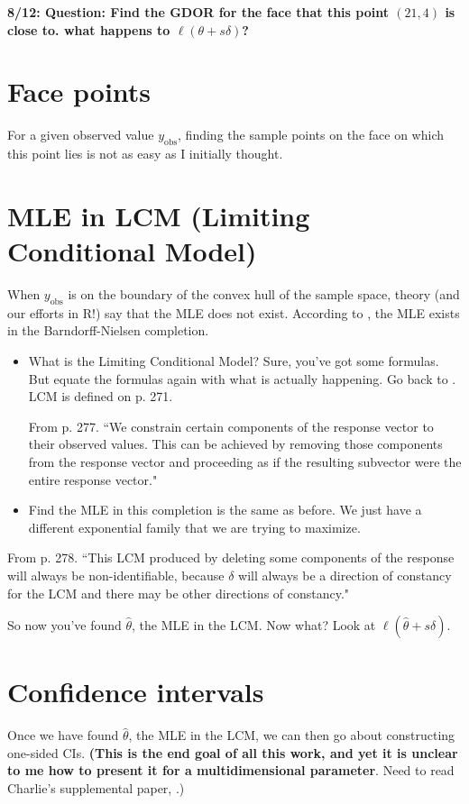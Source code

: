 \documentclass{amsbook}
\newcommand{\yobs}{y_{\textrm{obs}}}
\theoremstyle{definition}
\theoremstyle{remark}
\begin{document}
\textbf{8/12: Question:  Find the GDOR for the face that this point $(21,4)$ is close to.  what happens to $\ell(\theta + s \delta)$?}

\section{Face points}
For a given observed value $\yobs$, finding the sample points on the face on which 
this point lies is not as easy as I initially thought.

\section{MLE in LCM (Limiting Conditional Model)}

When $\yobs$ is on the boundary of the convex hull of the sample space, theory (and our efforts in R!) say that the MLE does not exist.  According to \citet{Geyer:gdor}, the MLE exists in the Barndorff-Nielsen completion.  
\begin{itemize}
\item What is the Limiting Conditional Model?  Sure, you've got some formulas.  But equate the formulas again 
with what is actually happening.  Go back to \citet[Theorem~6]{Geyer:gdor}.  LCM is 
defined on p. 271.

From p. 277.  ``We constrain certain components of the response vector to their 
observed values.  This can be achieved by removing those components from the response 
vector and proceeding as if the resulting subvector were the entire response vector."
\item Find the MLE in this completion is the same as before.  We just have a different exponential family that we are trying to maximize.
\end{itemize}

From p. 278.  ``This LCM produced by deleting some components of the response will 
always be non-identifiable, because $\delta$ will always be a direction of constancy 
for the LCM and there may be other directions of constancy."

So now you've found $\hat{\theta}$, the MLE in the LCM.  Now what?  Look at $\ell(\hat
{\theta} + s \delta)$.

\section{Confidence intervals}
Once we have found $\hat{\theta}$, the MLE in the LCM, we can then go about 
constructing one-sided CIs.  \textbf{(This is the end goal of all this work, and yet it 
is unclear to me how to present it for a multidimensional parameter}.  Need to read 
Charlie's supplemental paper, \citet{geyer:2008}.)
\end{document}
